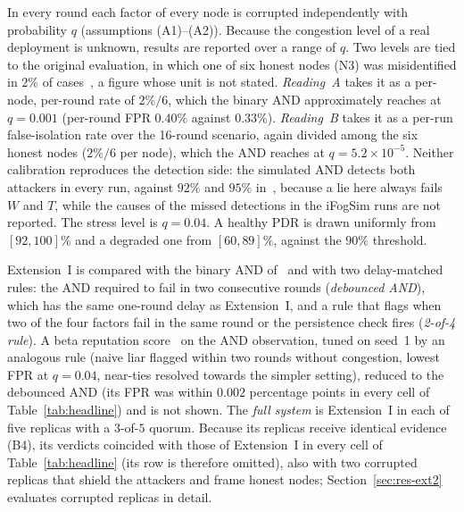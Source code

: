 \documentclass[lineno,pdflatex,sn-nature]{sn-jnl}
\theoremstyle{thmstyleone}%
\theoremstyle{thmstylethree}%
\begin{document}
In every round each factor of every node is corrupted independently
with probability $q$ (assumptions (A1)--(A2)).  Because the congestion level of
a real deployment is unknown, results are reported over a range of
$q$.  Two levels are tied to the original evaluation, in which one of
six honest nodes (N3) was misidentified in $2\%$ of
cases~\cite{soula2024iodt}, a figure whose unit is not stated.
\emph{Reading~A} takes it as a per-node, per-round rate of $2\%/6$,
which the binary AND approximately reaches at $q=0.001$ (per-round
FPR $0.40\%$ against $0.33\%$).  \emph{Reading~B} takes it as a
per-run false-isolation rate over the 16-round scenario, again
divided among the six honest nodes ($2\%/6$ per node), which the AND
reaches at $q=5.2\times10^{-5}$.  Neither calibration
reproduces the detection side: the simulated AND detects both attackers
in every run, against $92\%$ and $95\%$ in~\cite{soula2024iodt},
because a lie here always fails $W$ and $T$, while the causes of the
missed detections in the iFogSim runs are not reported.  The stress
level is $q=0.04$.  A healthy PDR is drawn uniformly from $[92,100]\%$
and a degraded one from $[60,89]\%$, against the $90\%$ threshold.

Extension~I is compared with the binary AND of~\cite{soula2024iodt}
and with two delay-matched rules: the AND required to fail in two
consecutive rounds (\emph{debounced AND}), which has the same one-round
delay as Extension~I, and a rule that flags when two of the four
factors fail in the same round or the persistence check fires
(\emph{2-of-4 rule}).  A beta reputation score~\cite{josang2002beta}
on the AND observation, tuned on seed~1 by an analogous rule
(naive liar flagged within two rounds without congestion, lowest FPR
at $q=0.04$, near-ties resolved towards the simpler setting),
reduced to the debounced AND (its FPR was within $0.002$ percentage
points in every cell of Table~\ref{tab:headline}) and is not shown.
The \emph{full system} is Extension~I in each of five replicas with a
$3$-of-$5$ quorum.  Because its replicas receive identical evidence
(B4), its verdicts coincided with those of Extension~I in every cell
of Table~\ref{tab:headline} (its row is therefore omitted), also with two corrupted replicas that
shield the attackers and frame honest nodes;
Section~\ref{sec:res-ext2} evaluates corrupted replicas in detail.
\end{document}
